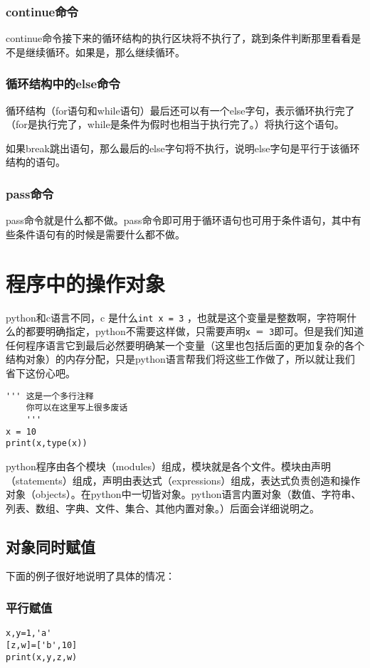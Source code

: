 \documentclass[12pt,oneside]{book}
\begin{document}
\begin{common-format}
\subsection{continue命令}
continue命令接下来的循环结构的执行区块将不执行了，跳到条件判断那里看看是不是继续循环。如果是，那么继续循环。

\subsection{循环结构中的else命令}
循环结构（for语句和while语句）最后还可以有一个else字句，表示循环执行完了（for是执行完了，while是条件为假时也相当于执行完了。）将执行这个语句。

如果break跳出语句，那么最后的else字句将不执行，说明else字句是平行于该循环结构的语句。

\subsection{pass命令}
pass命令就是什么都不做。pass命令即可用于循环语句也可用于条件语句，其中有些条件语句有的时候是需要什么都不做。





\chapter{程序中的操作对象}
python和c语言不同，c 是什么\verb+int x = 3+ ，也就是这个变量是整数啊，字符啊什么的都要明确指定，python不需要这样做，只需要声明\verb+x ＝ 3+即可。但是我们知道任何程序语言它到最后必然要明确某一个变量（这里也包括后面的更加复杂的各个结构对象）的内存分配，只是python语言帮我们将这些工作做了，所以就让我们省下这份心吧。

\begin{Verbatim}
''' 这是一个多行注释
    你可以在这里写上很多废话
    '''
x = 10
print(x,type(x))
\end{Verbatim}

python程序由各个模块（modules）组成，模块就是各个文件。模块由声明（statements）组成，声明由表达式（expressions）组成，表达式负责创造和操作对象（objects）。在python中一切皆对象。python语言内置对象（数值、字符串、列表、数组、字典、文件、集合、其他内置对象。）后面会详细说明之。


\section{对象同时赋值}
下面的例子很好地说明了具体的情况：
\subsection{平行赋值}
\begin{Verbatim}
x,y=1,'a'
[z,w]=['b',10]
print(x,y,z,w)
\end{Verbatim}


\end{common-format}
\end{document}

